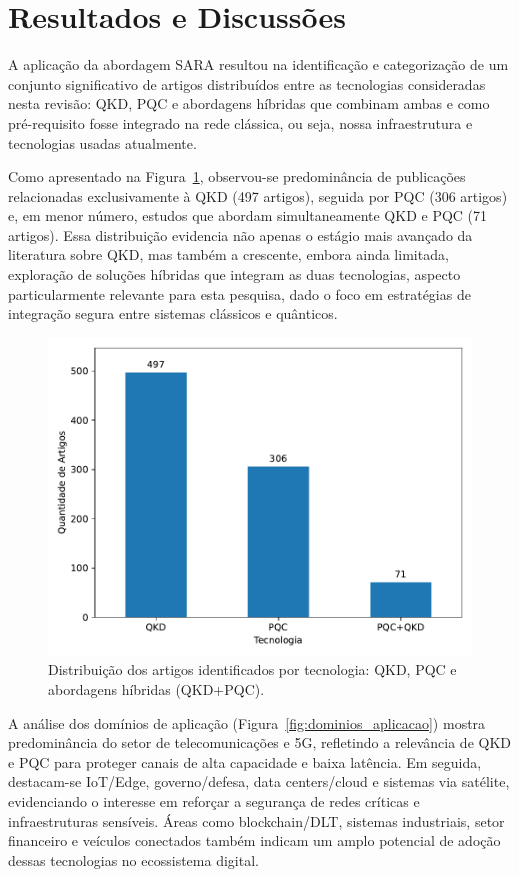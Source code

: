 \documentclass{siintec}
\begin{document}
\section{Resultados e Discussões}
A aplicação da abordagem SARA resultou na identificação e categorização de um conjunto significativo de artigos distribuídos entre as tecnologias consideradas nesta revisão: QKD, PQC e abordagens híbridas que combinam ambas e como pré-requisito fosse integrado na rede clássica, ou seja, nossa infraestrutura e tecnologias usadas atualmente. 

Como apresentado na Figura~\ref{fig:qtd_artigos_tecnologia}, observou-se predominância de publicações relacionadas exclusivamente à QKD (497 artigos), seguida por PQC (306 artigos) e, em menor número, estudos que abordam simultaneamente QKD e PQC (71 artigos). Essa distribuição evidencia não apenas o estágio mais avançado da literatura sobre QKD, mas também a crescente, embora ainda limitada, exploração de soluções híbridas que integram as duas tecnologias, aspecto particularmente relevante para esta pesquisa, dado o foco em estratégias de integração segura entre sistemas clássicos e quânticos.

\begin{figure}[t!]
    \centering
    \includegraphics[width=0.95\linewidth]{img/q1.pdf}
    \caption{Distribuição dos artigos identificados por tecnologia: QKD, PQC e abordagens híbridas (QKD+PQC).}
    \label{fig:qtd_artigos_tecnologia}
\end{figure}

A análise dos domínios de aplicação (Figura~\ref{fig:dominios_aplicacao}) mostra predominância do setor de telecomunicações e 5G, refletindo a relevância de QKD e PQC para proteger canais de alta capacidade e baixa latência. Em seguida, destacam-se IoT/Edge, governo/defesa, data centers/cloud e sistemas via satélite, evidenciando o interesse em reforçar a segurança de redes críticas e infraestruturas sensíveis. Áreas como blockchain/DLT, sistemas industriais, setor financeiro e veículos conectados também indicam um amplo potencial de adoção dessas tecnologias no ecossistema digital.
\end{document}
